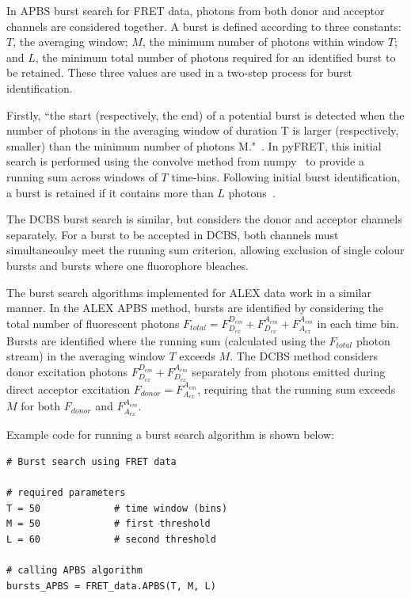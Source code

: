 \documentclass[10pt]{article}
\begin{document}
In APBS burst search for FRET data, photons from both donor and acceptor channels are considered together. A burst is defined according to three constants: $T$, the averaging window; $M$, the minimum number of photons within window $T$; and $L$, the minimum total number of photons required for an identified burst to be retained. These three values are used in a two-step process for burst identification.

Firstly, ``the start (respectively, the end) of a potential burst is detected when the number of photons in the averaging window of duration T is larger (respectively, smaller) than the minimum number of photons M."~\cite{nir06}. In pyFRET, this initial search is performed using the convolve method from numpy~\cite{numpy11} to provide a running sum across windows of $T$ time-bins. Following initial burst identification, a burst is retained if it contains more than $L$ photons~\cite{nir06}.

The DCBS burst search is similar, but considers the donor and acceptor channels separately. For a burst to be accepted in DCBS, both channels must simultaneoulsy meet the running sum criterion, allowing exclusion of single colour bursts and bursts where one fluorophore bleaches.

The burst search algorithms implemented for ALEX data work in a similar manner. In the ALEX APBS method, bursts are identified by considering the total number of fluorescent photons $F_{total} = F_{D_{ex}}^{D_{em}} + F_{D_{ex}}^{A_{em}} + F_{A_{ex}}^{A_{em}}$ in each time bin. Bursts are identified where the running sum (calculated using the  $F_{total}$ photon stream) in the averaging window $T$ exceeds $M$. The DCBS method considers donor excitation photons $F_{D_{ex}}^{D_{em}} + F_{D_{ex}}^{A_{em}}$ separately from photons emitted during direct acceptor excitation $F_{donor} = F_{A_{ex}}^{A_{em}}$, requiring that the running sum exceeds $M$ for both $F_{donor}$ and $F_{A_{ex}}^{A_{em}}$.

Example code for running a burst search algorithm is shown below:

\begin{lstlisting}
# Burst search using FRET data

# required parameters
T = 50             # time window (bins)
M = 50             # first threshold
L = 60             # second threshold

# calling APBS algorithm
bursts_APBS = FRET_data.APBS(T, M, L)
\end{lstlisting}
\end{document}
